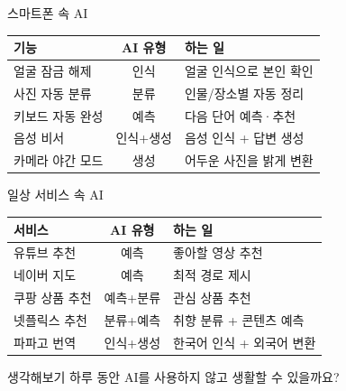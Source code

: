 \documentclass[aspectratio=169]{beamer}
\begin{document}
\begin{frame}{스마트폰 속 AI}
\begin{center}
\begin{tabular}{|p{3.5cm}|c|p{5cm}|}
\hline
\rowcolor{tableheader}
\textbf{기능} & \textbf{AI 유형} & \textbf{하는 일} \\
\hline
얼굴 잠금 해제 & 인식 & 얼굴 인식으로 본인 확인 \\
\hline
사진 자동 분류 & 분류 & 인물/장소별 자동 정리 \\
\hline
키보드 자동 완성 & 예측 & 다음 단어 예측·추천 \\
\hline
음성 비서 & 인식+생성 & 음성 인식 + 답변 생성 \\
\hline
카메라 야간 모드 & 생성 & 어두운 사진을 밝게 변환 \\
\hline
\end{tabular}
\end{center}
\end{frame}

\begin{frame}{일상 서비스 속 AI}
\begin{center}
\begin{tabular}{|p{3cm}|c|p{5.5cm}|}
\hline
\rowcolor{tableheader}
\textbf{서비스} & \textbf{AI 유형} & \textbf{하는 일} \\
\hline
유튜브 추천 & 예측 & 좋아할 영상 추천 \\
\hline
네이버 지도 & 예측 & 최적 경로 제시 \\
\hline
쿠팡 상품 추천 & 예측+분류 & 관심 상품 추천 \\
\hline
넷플릭스 추천 & 분류+예측 & 취향 분류 + 콘텐츠 예측 \\
\hline
파파고 번역 & 인식+생성 & 한국어 인식 + 외국어 변환 \\
\hline
\end{tabular}
\end{center}
\vspace{0.3cm}
\begin{alertblock}{ 생각해보기}
하루 동안 AI를 사용하지 않고 생활할 수 있을까요?
\end{alertblock}
\end{frame}
\end{document}
